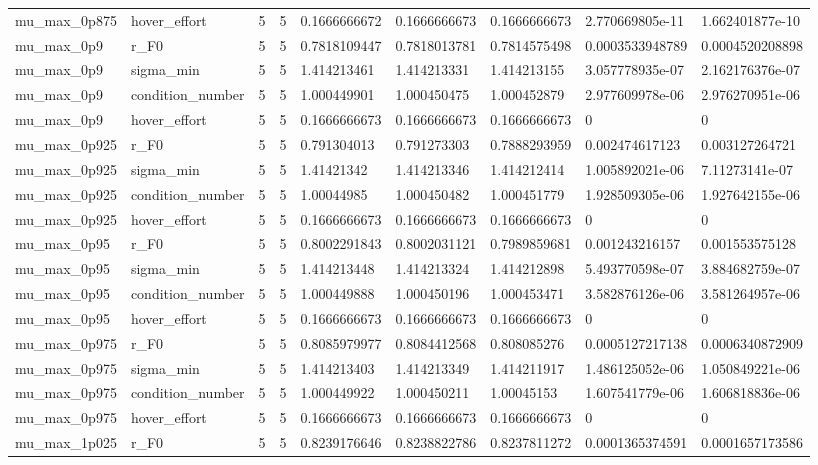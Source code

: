 \begin{tabular}{@{}lllllllll@{}}
mu\_max\_0p875 & hover\_effort & 5 & 5 & 0.1666666672 & 0.1666666673 & 0.1666666673 & 2.770669805e-11 & 1.662401877e-10 \\
mu\_max\_0p9 & r\_F0 & 5 & 5 & 0.7818109447 & 0.7818013781 & 0.7814575498 & 0.0003533948789 & 0.0004520208898 \\
mu\_max\_0p9 & sigma\_min & 5 & 5 & 1.414213461 & 1.414213331 & 1.414213155 & 3.057778935e-07 & 2.162176376e-07 \\
mu\_max\_0p9 & condition\_number & 5 & 5 & 1.000449901 & 1.000450475 & 1.000452879 & 2.977609978e-06 & 2.976270951e-06 \\
mu\_max\_0p9 & hover\_effort & 5 & 5 & 0.1666666673 & 0.1666666673 & 0.1666666673 & 0 & 0 \\
mu\_max\_0p925 & r\_F0 & 5 & 5 & 0.791304013 & 0.791273303 & 0.7888293959 & 0.002474617123 & 0.003127264721 \\
mu\_max\_0p925 & sigma\_min & 5 & 5 & 1.41421342 & 1.414213346 & 1.414212414 & 1.005892021e-06 & 7.11273141e-07 \\
mu\_max\_0p925 & condition\_number & 5 & 5 & 1.00044985 & 1.000450482 & 1.000451779 & 1.928509305e-06 & 1.927642155e-06 \\
mu\_max\_0p925 & hover\_effort & 5 & 5 & 0.1666666673 & 0.1666666673 & 0.1666666673 & 0 & 0 \\
mu\_max\_0p95 & r\_F0 & 5 & 5 & 0.8002291843 & 0.8002031121 & 0.7989859681 & 0.001243216157 & 0.001553575128 \\
mu\_max\_0p95 & sigma\_min & 5 & 5 & 1.414213448 & 1.414213324 & 1.414212898 & 5.493770598e-07 & 3.884682759e-07 \\
mu\_max\_0p95 & condition\_number & 5 & 5 & 1.000449888 & 1.000450196 & 1.000453471 & 3.582876126e-06 & 3.581264957e-06 \\
mu\_max\_0p95 & hover\_effort & 5 & 5 & 0.1666666673 & 0.1666666673 & 0.1666666673 & 0 & 0 \\
mu\_max\_0p975 & r\_F0 & 5 & 5 & 0.8085979977 & 0.8084412568 & 0.808085276 & 0.0005127217138 & 0.0006340872909 \\
mu\_max\_0p975 & sigma\_min & 5 & 5 & 1.414213403 & 1.414213349 & 1.414211917 & 1.486125052e-06 & 1.050849221e-06 \\
mu\_max\_0p975 & condition\_number & 5 & 5 & 1.000449922 & 1.000450211 & 1.00045153 & 1.607541779e-06 & 1.606818836e-06 \\
mu\_max\_0p975 & hover\_effort & 5 & 5 & 0.1666666673 & 0.1666666673 & 0.1666666673 & 0 & 0 \\
mu\_max\_1p025 & r\_F0 & 5 & 5 & 0.8239176646 & 0.8238822786 & 0.8237811272 & 0.0001365374591 & 0.0001657173586 \\

\end{tabular}
